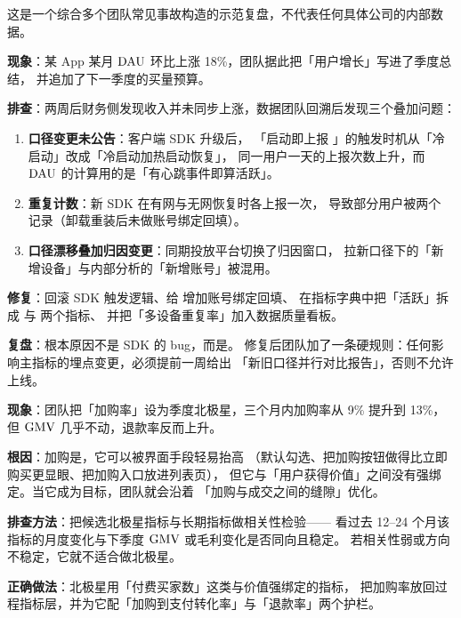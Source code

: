 \begin{casebox}
这是一个综合多个团队常见事故构造的示范复盘，不代表任何具体公司的内部数据。

\textbf{现象}：某 App 某月 $\operatorname{DAU}$ 环比上涨 18\%，团队据此把「用户增长」写进了季度总结，
并追加了下一季度的买量预算。

\textbf{排查}：两周后财务侧发现收入并未同步上涨，数据团队回溯后发现三个叠加问题：
\begin{enumerate}
  \item \textbf{口径变更未公告}：客户端 SDK 升级后，
        「启动即上报 」的触发时机从「冷启动」改成「冷启动加热启动恢复」，
        同一用户一天的上报次数上升，而 $\operatorname{DAU}$ 的计算用的是「有心跳事件即算活跃」。
  \item \textbf{重复计数}：新 SDK 在有网与无网恢复时各上报一次，
        导致部分用户被两个  记录（卸载重装后未做账号绑定回填）。
  \item \textbf{口径漂移叠加归因变更}：同期投放平台切换了归因窗口，
        拉新口径下的「新增设备」与内部分析的「新增账号」被混用。
\end{enumerate}

\textbf{修复}：回滚 SDK 触发逻辑、给  增加账号绑定回填、
在指标字典中把「活跃」拆成  与  两个指标、
并把「多设备重复率」加入数据质量看板。

\textbf{复盘}：根本原因不是 SDK 的 bug，而是。
修复后团队加了一条硬规则：任何影响主指标的埋点变更，必须提前一周给出
「新旧口径并行对比报告」，否则不允许上线。
\end{casebox}

\begin{pitfall}
\textbf{现象}：团队把「加购率」设为季度北极星，三个月内加购率从 9\% 提升到 13\%，
但 $\operatorname{GMV}$ 几乎不动，退款率反而上升。

\textbf{根因}：加购是，它可以被界面手段轻易抬高
（默认勾选、把加购按钮做得比立即购买更显眼、把加购入口放进列表页），
但它与「用户获得价值」之间没有强绑定。当它成为目标，团队就会沿着
「加购与成交之间的缝隙」优化。

\textbf{排查方法}：把候选北极星指标与长期指标做相关性检验——
看过去 12--24 个月该指标的月度变化与下季度 $\operatorname{GMV}$ 或毛利变化是否同向且稳定。
若相关性弱或方向不稳定，它就不适合做北极星。

\textbf{正确做法}：北极星用「付费买家数」这类与价值强绑定的指标，
把加购率放回过程指标层，并为它配「加购到支付转化率」与「退款率」两个护栏。
\end{pitfall}

